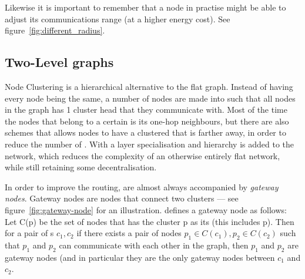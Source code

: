 
Likewise it is important to remember that a node in practise might be able to adjust its communications range (at a higher energy cost). See figure~\ref{fig:different_radius}.

\subsection{Two-Level graphs}

\label{cluster methods}
Node Clustering is a hierarchical alternative to the flat graph. Instead of having every node being the same, a number of nodes are made into \ch such that all nodes in the graph has 1 cluster head that they communicate with. Most of the time the nodes that belong to a certain \ch is its one-hop neighbours, but there are also schemes that allows nodes to have a clustered that is farther away, in order to reduce the number of \ch. With \ch a layer specialisation and hierarchy is added to the network, which reduces the complexity of an otherwise entirely flat network, while still retaining some decentralisation.

In order to improve the routing, \ch are almost always accompanied by \emph{gateway nodes}. Gateway nodes are nodes that connect two clusters --- see figure~\ref{fig:gateway-node} for an illustration. \cite{spanners} defines a gateway node as follows:
Let C(p) be the set of nodes that has the cluster p as its \ch (this includes p). Then for a pair of \ch s $c_1, c_2$ if there exists a pair of nodes $p_1 \in C(c_1), p_2 \in C(c_2)$ such that $p_1$ and $p_2$ can communicate with each other in the graph, then $p_1$ and $p_2$ are gateway nodes (and in particular they are the only gateway nodes between $c_1$ and $c_2$.  

